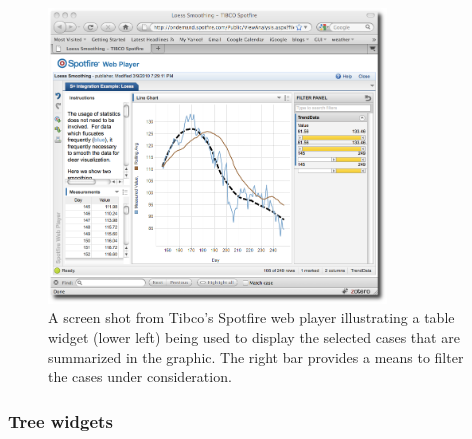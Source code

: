 \begin{figure}
  \centering
  \includegraphics[width=0.8\textwidth]{fig-spotfire}
  \caption{A screen shot from Tibco's Spotfire web player illustrating a table widget (lower left) being used to display the selected cases that are summarized in the graphic. The right bar provides a means to filter the cases under consideration.}
  \label{fig:GUI:spotfire}
\end{figure}


    

\subsubsection{Tree widgets}
\label{sec:GUI:tree-widgets}

